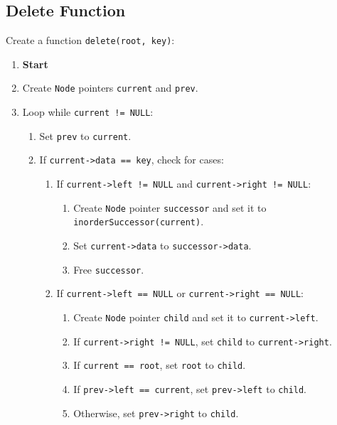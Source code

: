 {  \subsection{Delete Function}
  Create a function \texttt{delete(root, key)}:
  \begin{enumerate}[label=\arabic*:,left=0pt]
    \item \textbf{Start}
    \item Create \texttt{Node} pointers \texttt{current} and \texttt{prev}.
    \item Loop while \texttt{current != NULL}:
          \begin{enumerate}[label=3.\arabic*:, start=1]
            \item Set \texttt{prev} to \texttt{current}.
            \item If \texttt{current->data == key}, check for cases:
                  \begin{enumerate}[label=3.2.\arabic*:, start=1]
                    \item If \texttt{current->left != NULL} and \texttt{current->right != NULL}:
                          \begin{enumerate}[label=3.2.1.\arabic*:, start=1]
                            \item Create \texttt{Node} pointer \texttt{successor} and set it to \texttt{inorderSuccessor(current)}.
                            \item Set \texttt{current->data} to \texttt{successor->data}.
                            \item Free \texttt{successor}.
                          \end{enumerate}
                    \item If \texttt{current->left == NULL} or \texttt{current->right == NULL}:
                          \begin{enumerate}[label=3.2.2.\arabic*:, start=1]
                            \item Create \texttt{Node} pointer \texttt{child} and set it to \texttt{current->left}.
                            \item If \texttt{current->right != NULL}, set \texttt{child} to \texttt{current->right}.
                            \item If \texttt{current == root}, set \texttt{root} to \texttt{child}.
                            \item If \texttt{prev->left == current}, set \texttt{prev->left} to \texttt{child}.
                            \item Otherwise, set \texttt{prev->right} to \texttt{child}.

\end{enumerate}
\end{enumerate}
\end{enumerate}
\end{enumerate}}
